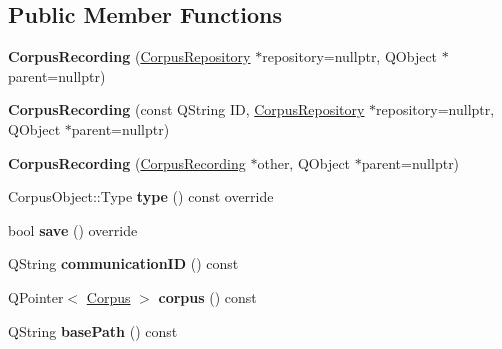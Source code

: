 \subsection*{Public Member Functions}
\begin{DoxyCompactItemize}
\item 
\mbox{\label{class_corpus_recording_a98f422ade47706ab47ed27ee6c31fbac}} 
{\bfseries Corpus\+Recording} (\hyperlink{class_corpus_repository}{Corpus\+Repository} $\ast$repository=nullptr, Q\+Object $\ast$parent=nullptr)
\item 
\mbox{\label{class_corpus_recording_a3e3502c3e982a42c8e60a15594b569c2}} 
{\bfseries Corpus\+Recording} (const Q\+String ID, \hyperlink{class_corpus_repository}{Corpus\+Repository} $\ast$repository=nullptr, Q\+Object $\ast$parent=nullptr)
\item 
\mbox{\label{class_corpus_recording_ad1364e9a6f224e418644bbacd9b1b36b}} 
{\bfseries Corpus\+Recording} (\hyperlink{class_corpus_recording}{Corpus\+Recording} $\ast$other, Q\+Object $\ast$parent=nullptr)
\item 
\mbox{\label{class_corpus_recording_ac9a6a1406274c3dd36f0f562b531c522}} 
Corpus\+Object\+::\+Type {\bfseries type} () const override
\item 
\mbox{\label{class_corpus_recording_a9ce3f0e38c3a75e8ca229cf2df81ccb2}} 
bool {\bfseries save} () override
\item 
\mbox{\label{class_corpus_recording_a443e8b8066600c9e6f0ed8a16a42e07e}} 
Q\+String {\bfseries communication\+ID} () const
\item 
\mbox{\label{class_corpus_recording_a256617f005a6bc4360b13b552f8dd642}} 
Q\+Pointer$<$ \hyperlink{class_corpus}{Corpus} $>$ {\bfseries corpus} () const
\item 
\mbox{\label{class_corpus_recording_a4336b3b38d50cc436e6bf5e434c14d08}} 
Q\+String {\bfseries base\+Path} () const
\item 
\mbox{\label{class_corpus_recording_aa7d7f7139097301dd35e199e2ac3b505}} 

\end{DoxyCompactItemize}
